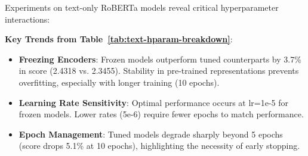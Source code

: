 Experiments on text-only RoBERTa models reveal critical hyperparameter interactions:

\begin{table}[ht]
    \centering
    \caption{Impact of learning rate, epoch count, optimizer, and freezing on text-only performance. The best configuration is in bold.}
    \label{tab:text-hparam-breakdown}
\end{table}


\noindent \textbf{Key Trends from Table~\ref{tab:text-hparam-breakdown}}:
\begin{itemize}
    \item \textbf{Freezing Encoders}: Frozen models outperform tuned counterparts by 3.7\% in score (2.4318 vs. 2.3455). Stability in pre-trained representations prevents overfitting, especially with longer training (10 epochs).
    \item \textbf{Learning Rate Sensitivity}: Optimal performance occurs at lr=1e-5 for frozen models. Lower rates (5e-6) require fewer epochs to match performance.
    \item \textbf{Epoch Management}: Tuned models degrade sharply beyond 5 epochs (score drops 5.1\% at 10 epochs), highlighting the necessity of early stopping.
\end{itemize}

